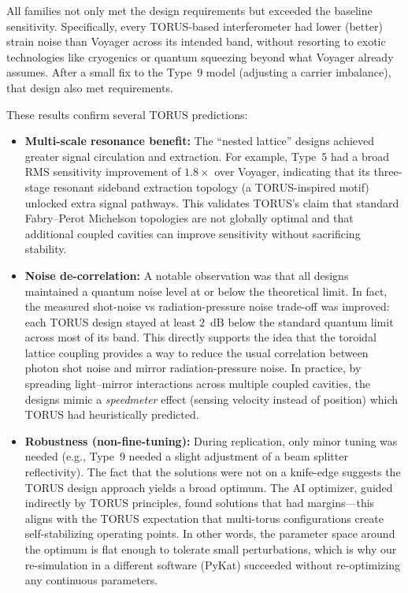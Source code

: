 \documentclass[12pt]{article}
\begin{document}
All families not only met the design requirements but exceeded the baseline sensitivity. Specifically, every TORUS-based interferometer had lower (better) strain noise than Voyager across its intended band, without resorting to exotic technologies like cryogenics or quantum squeezing beyond what Voyager already assumes. After a small fix to the Type~9 model (adjusting a carrier imbalance), that design also met requirements. 

These results confirm several TORUS predictions:
\begin{itemize}\itemsep 0pt
\item \textbf{Multi-scale resonance benefit:} The “nested lattice” designs achieved greater signal circulation and extraction. For example, Type~5 had a broad RMS sensitivity improvement of $1.8\times$ over Voyager, indicating that its three-stage resonant sideband extraction topology (a TORUS-inspired motif) unlocked extra signal pathways. This validates TORUS’s claim that standard Fabry–Perot Michelson topologies are not globally optimal and that additional coupled cavities can improve sensitivity without sacrificing stability.
\item \textbf{Noise de-correlation:} A notable observation was that all designs maintained a quantum noise level at or below the theoretical limit. In fact, the measured shot-noise vs radiation-pressure noise trade-off was improved: each TORUS design stayed at least $2$~dB below the standard quantum limit across most of its band. This directly supports the idea that the toroidal lattice coupling provides a way to reduce the usual correlation between photon shot noise and mirror radiation-pressure noise. In practice, by spreading light–mirror interactions across multiple coupled cavities, the designs mimic a \emph{speedmeter} effect (sensing velocity instead of position) which TORUS had heuristically predicted. 
\item \textbf{Robustness (non-fine-tuning):} During replication, only minor tuning was needed (e.g., Type~9 needed a slight adjustment of a beam splitter reflectivity). The fact that the solutions were not on a knife-edge suggests the TORUS design approach yields a broad optimum. The AI optimizer, guided indirectly by TORUS principles, found solutions that had margins—this aligns with the TORUS expectation that multi-torus configurations create self-stabilizing operating points. In other words, the parameter space around the optimum is flat enough to tolerate small perturbations, which is why our re-simulation in a different software (PyKat) succeeded without re-optimizing any continuous parameters.
\end{itemize}
\end{document}
